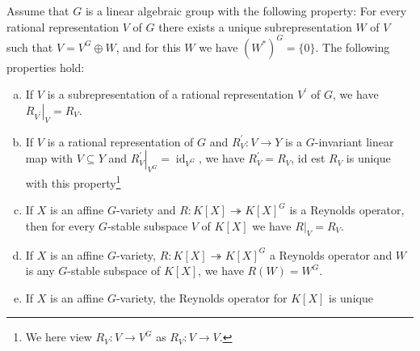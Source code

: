 \begin{lemma}\label{lamm}
  Assume that $G$ is a linear algebraic group with the following property:
  For every rational representation $V$ of $G$ there exists a unique subrepresentation $W$ of $V$ such that $V = V^G \oplus W$, and for this $W$ we have $(W^\ast)^G = \{0\}$.
  The following properties hold:
  \begin{enumerate}[(a)]
  \item If $V$ is a subrepresentation of a rational representation $V^\prime$ of $G$, we have $\left. R_{V^\prime} \right|_V = R_V$.
  \item If $V$ is a rational representation of $G$ and $R^\prime_V \colon V \rightarrow Y$ is a $G$-invariant linear map with $V \subseteq Y$ and $ \left. R^\prime_V \right|_{V^G} = \operatorname{id}_{V^G}$, we have $R^\prime_V = R_V$, id est $R_V$ is unique with this property\footnote{We here view $R_V \colon V \rightarrow V^G$ as $R_V \colon V \rightarrow V$.}
  \item If $X$ is an affine $G$-variety and $R \colon K[X] \twoheadrightarrow K[X]^G$ is a Reynolds operator, then for every $G$-stable subspace $V$ of $K[X]$ we have $\left. R \right|_V = R_V$.
  \item If $X$ is an affine $G$-variety, $R \colon K[X] \twoheadrightarrow K[X]^G$ a Reynolds operator and $W$ is any $G$-stable subspace of $K[X]$, we have $R(W) = W^G$.
  \item If $X$ is an affine $G$-variety, the Reynolds operator for $K[X]$ is unique
  \end{enumerate}
\end{lemma}

